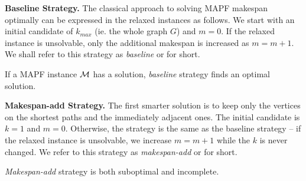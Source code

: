 \textbf{Baseline Strategy.}
%
The classical approach to solving MAPF makespan optimally can be expressed in the relaxed instances as follows. We start with an initial candidate of $k_{max}$ (ie. the whole graph $G$) and $m=0$. If the relaxed instance is unsolvable, only the additional makespan is increased as $m=m+1$. %
We shall refer to this strategy as \emph{baseline} or \ssb{} for short.

\begin{prop}\label{prop:baseline}
If a MAPF instance $\mathcal{M}$ has a solution, \emph{baseline} strategy finds an optimal solution.
\end{prop}


\textbf{Makespan-add Strategy.}
%
The first smarter solution is to keep only the vertices on the shortest paths and the immediately adjacent ones. The initial candidate is $k=1$ and $m=0$. Otherwise, the strategy is the same as the baseline strategy -- if the relaxed instance is unsolvable, we increase $m = m+1$ while the $k$ is never changed. We refer to this strategy as \emph{makespan-add} or \ssm{} for short.

\begin{prop}
\emph{Makespan-add} strategy is both suboptimal and incomplete.~\cite{AAMAS_corridors}
\end{prop}




